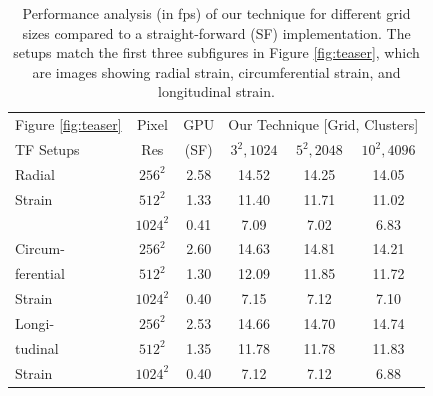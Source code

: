 \documentclass[review,journal]{vgtc}         %
\begin{document}
\begin{table}[b]
  \caption{Performance analysis (in fps) of our technique for different grid sizes compared to a straight-forward (SF) implementation. The setups match the first three subfigures in Figure \ref{fig:teaser}, which are images showing radial strain, circumferential strain, and longitudinal strain.}
  \label{tab:performance}
  \begin{center}
    \begin{tabular}{|l|c|c|c|c|c|}
      \hline
      Figure \ref{fig:teaser} & Pixel & GPU & \multicolumn{3}{c|}{Our Technique [Grid, Clusters]}\\
      TF Setups & Res & (SF) & $3^2,1024$ & $5^2,2048$ & $10^2,4096$ \\
      \hline
      Radial & $256^2$ & 2.58 & 14.52 & 14.25 & 14.05\\
      Strain & $512^2$ & 1.33 & 11.40 & 11.71 & 11.02\\
      & $1024^2$ & 0.41 & 7.09 & 7.02 & 6.83\\
      \hline
      Circum- & $256^2$ & 2.60 & 14.63 & 14.81 & 14.21\\
      ferential & $512^2$ & 1.30 & 12.09 & 11.85 & 11.72\\
      Strain & $1024^2$ & 0.40 & 7.15 & 7.12 & 7.10\\
      \hline
      Longi- & $256^2$ & 2.53 & 14.66 & 14.70 & 14.74\\
      tudinal & $512^2$ & 1.35 & 11.78 & 11.78 & 11.83\\
      Strain & $1024^2$ & 0.40 & 7.12 & 7.12 & 6.88\\
      \hline
    \end{tabular}
  \end{center}
\end{table}
\end{document}

